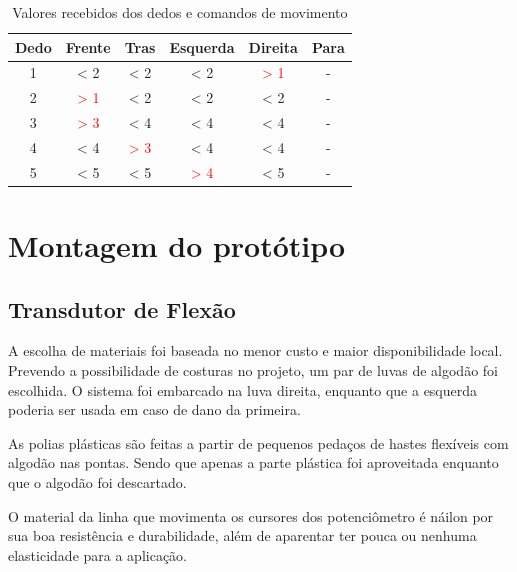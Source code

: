 \documentclass[
	12pt,				%
	openright,			%
	oneside,			%
	a4paper,			%
	english,			%
	brazil				%
	]{abntex2}
\begin{document}
		\begin{table}[H]
     \centering
     \caption{Valores recebidos dos dedos e comandos de movimento}
     \begin{tabular}{c|ccccc}
			 \midrule
			 Dedo &       Frente			 & 				Tras				& 		Esquerda			 & 		Direita					& Para	\\
			 \midrule
			 1    & < 2   						 & < 2   							& < 2    						 &\textcolor{red}{> 1}&	-			\\
			 2    &\textcolor{red}{> 1}& < 2   							& < 2  	 						 & < 2   							&	-			\\
			 3    &\textcolor{red}{> 3}& < 4   							& < 4   						 & < 4   							&	-			\\
			 4    & < 4   						 &\textcolor{red}{> 3}& < 4 							 & < 4   							&	-			\\
			 5    & < 5   						 & < 5   							&\textcolor{red}{> 4}& < 5   							&	-			\\
			 \midrule
     \end{tabular}
     \label{Tab:dedos-e-comandos1}
   \end{table}





		\section{Montagem do protótipo}

		\subsection{Transdutor de Flexão}

		A escolha de materiais foi baseada no menor custo e maior disponibilidade local. Prevendo a possibilidade de costuras no projeto, um par de luvas de algodão foi escolhida. O sistema foi embarcado na luva direita, enquanto que a esquerda poderia ser usada em caso de dano da primeira.
		
		As polias plásticas são feitas a partir de pequenos pedaços de hastes flexíveis com algodão nas pontas. Sendo que apenas a parte plástica foi aproveitada enquanto que o algodão foi descartado.

		O material da linha que movimenta os cursores dos potenciômetro é náilon por sua boa resistência e durabilidade, além de aparentar ter pouca ou nenhuma elasticidade para a aplicação.
\end{document}
